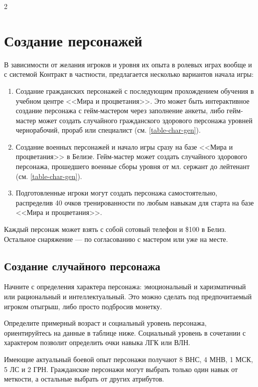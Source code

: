 \documentclass{article}
\begin{document}
\begin{multicols}{2}
\section{Создание персонажей}\label{character-creation}

В зависимости от желания игроков и уровня их опыта в ролевых играх вообще и с системой Контракт в частности, предлагается несколько вариантов начала игры:

\begin{enumerate}
\def\labelenumi{\arabic{enumi}.}
\item
  Создание гражданских персонажей с последующим прохождением обучения в учебном центре <<Мира и процветания>>. Это может быть интерактивное создание персонажа с гейм-мастером через заполнение анкеты, либо гейм-мастер может создать случайного гражданского здорового персонажа уровней чернорабочий, прораб или специалист (см. \autoref{table-char-gen}).
\item
  Создание военных персонажей и начало игры сразу на базе <<Мира и процветания>> в Белизе. Гейм-мастер может создать случайного здорового персонажа, прошедшего военные сборы уровня от мл. сержант до лейтенант (см. \autoref{table-char-gen}).
\item
  Подготовленные игроки могут создать персонажа самостоятельно, распределив 40 очков тренированности по любым навыкам для старта на базе <<Мира и процветания>>.
\end{enumerate}

Каждый персонаж может взять с собой сотовый телефон и \$100 в Белиз. Остальное снаряжение --- по согласованию с мастером или уже на месте.

\subsection{Создание случайного персонажа}\label{char-gen}

Начните с определения характера персонажа: эмоциональный и харизматичный или рациональный и интеллектуальный.
Это можно сделать под предпочитаемый игроком отыгрыш, либо просто подбросив монетку.

Определите примерный возраст и социальный уровень персонажа, ориентируйтесь на данные в таблице ниже.
Социальный уровень в сочетании с характером позволит определить очки навыка ЛГК или ВЛН.

Имеющие актуальный боевой опыт персонажи получают 8 ВНС, 4 МНВ, 1 МСК, 5 ЛС и 2 ГРН.
Гражданские персонажи могут выбрать только один навык от меткости, а остальные выбрать от других атрибутов.


\end{multicols}
\end{document}
